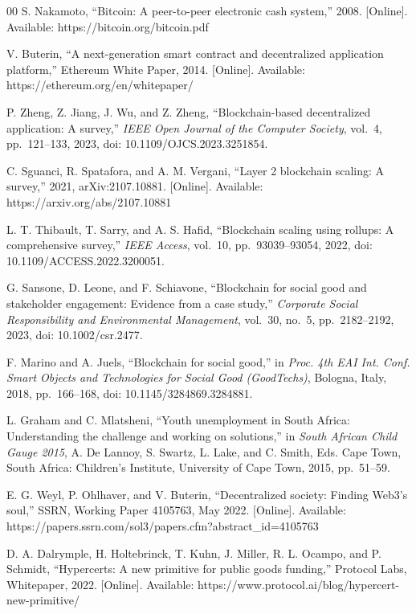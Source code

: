\documentclass[conference]{IEEEtran}
\begin{document}
\begin{thebibliography}{00}
	 S. Nakamoto, ``Bitcoin: A peer-to-peer electronic cash system,'' 2008. [Online]. Available: https://bitcoin.org/bitcoin.pdf

	 V. Buterin, ``A next-generation smart contract and decentralized application platform,'' Ethereum White Paper, 2014. [Online]. Available: https://ethereum.org/en/whitepaper/

	 P. Zheng, Z. Jiang, J. Wu, and Z. Zheng, ``Blockchain-based decentralized application: A survey,'' \emph{IEEE Open Journal of the Computer Society}, vol.~4, pp.~121--133, 2023, doi: 10.1109/OJCS.2023.3251854.

	 C. Sguanci, R. Spatafora, and A. M. Vergani, ``Layer 2 blockchain scaling: A survey,'' 2021, arXiv:2107.10881. [Online]. Available: https://arxiv.org/abs/2107.10881

	 L. T. Thibault, T. Sarry, and A. S. Hafid, ``Blockchain scaling using rollups: A comprehensive survey,'' \emph{IEEE Access}, vol.~10, pp.~93039--93054, 2022, doi: 10.1109/ACCESS.2022.3200051.

	 G. Sansone, D. Leone, and F. Schiavone, ``Blockchain for social good and stakeholder engagement: Evidence from a case study,'' \emph{Corporate Social Responsibility and Environmental Management}, vol.~30, no.~5, pp.~2182--2192, 2023, doi: 10.1002/csr.2477.

	 F. Marino and A. Juels, ``Blockchain for social good,'' in \emph{Proc. 4th EAI Int. Conf. Smart Objects and Technologies for Social Good (GoodTechs)}, Bologna, Italy, 2018, pp.~166--168, doi: 10.1145/3284869.3284881.

	 L. Graham and C. Mlatsheni, ``Youth unemployment in South Africa: Understanding the challenge and working on solutions,'' in \emph{South African Child Gauge 2015}, A. De Lannoy, S. Swartz, L. Lake, and C. Smith, Eds. Cape Town, South Africa: Children's Institute, University of Cape Town, 2015, pp.~51--59.

	 E. G. Weyl, P. Ohlhaver, and V. Buterin, ``Decentralized society: Finding Web3's soul,'' SSRN, Working Paper 4105763, May 2022. [Online]. Available: https://papers.ssrn.com/sol3/papers.cfm?abstract\_id=4105763

	 D. A. Dalrymple, H. Holtebrinck, T. Kuhn, J. Miller, R. L. Ocampo, and P. Schmidt, ``Hypercerts: A new primitive for public goods funding,'' Protocol Labs, Whitepaper, 2022. [Online]. Available: https://www.protocol.ai/blog/hypercert-new-primitive/


\end{thebibliography}
\end{document}
